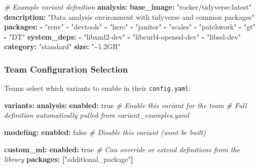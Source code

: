 \documentclass[
]{article}
\newenvironment{Shaded}{\begin{snugshade}}{\end{snugshade}}
\newcommand{\AttributeTok}[1]{\textcolor[rgb]{0.13,0.29,0.53}{#1}}
\newcommand{\CharTok}[1]{\textcolor[rgb]{0.31,0.60,0.02}{#1}}
\newcommand{\CommentTok}[1]{\textcolor[rgb]{0.56,0.35,0.01}{\textit{#1}}}
\newcommand{\FunctionTok}[1]{\textcolor[rgb]{0.13,0.29,0.53}{\textbf{#1}}}
\newcommand{\KeywordTok}[1]{\textcolor[rgb]{0.13,0.29,0.53}{\textbf{#1}}}
\newcommand{\StringTok}[1]{\textcolor[rgb]{0.31,0.60,0.02}{#1}}
\begin{document}
\begin{Shaded}
\begin{Highlighting}[]
\CommentTok{\# Example variant definition}
\FunctionTok{analysis}\KeywordTok{:}
\AttributeTok{  }\FunctionTok{base\_image}\KeywordTok{:}\AttributeTok{ }\StringTok{"rocker/tidyverse:latest"}
\AttributeTok{  }\FunctionTok{description}\KeywordTok{:}\AttributeTok{ }\StringTok{"Data analysis environment with tidyverse and common packages"}
\AttributeTok{  }\FunctionTok{packages}\KeywordTok{:}
\AttributeTok{    }\KeywordTok{{-}}\AttributeTok{ }\StringTok{"renv"}
\AttributeTok{    }\KeywordTok{{-}}\AttributeTok{ }\StringTok{"devtools"}
\AttributeTok{    }\KeywordTok{{-}}\AttributeTok{ }\StringTok{"here"}
\AttributeTok{    }\KeywordTok{{-}}\AttributeTok{ }\StringTok{"janitor"}
\AttributeTok{    }\KeywordTok{{-}}\AttributeTok{ }\StringTok{"scales"}
\AttributeTok{    }\KeywordTok{{-}}\AttributeTok{ }\StringTok{"patchwork"}
\AttributeTok{    }\KeywordTok{{-}}\AttributeTok{ }\StringTok{"gt"}
\AttributeTok{    }\KeywordTok{{-}}\AttributeTok{ }\StringTok{"DT"}
\AttributeTok{  }\FunctionTok{system\_deps}\KeywordTok{:}
\AttributeTok{    }\KeywordTok{{-}}\AttributeTok{ }\StringTok{"libxml2{-}dev"}
\AttributeTok{    }\KeywordTok{{-}}\AttributeTok{ }\StringTok{"libcurl4{-}openssl{-}dev"}
\AttributeTok{    }\KeywordTok{{-}}\AttributeTok{ }\StringTok{"libssl{-}dev"}
\AttributeTok{  }\FunctionTok{category}\KeywordTok{:}\AttributeTok{ }\StringTok{"standard"}
\AttributeTok{  }\FunctionTok{size}\KeywordTok{:}\AttributeTok{ }\StringTok{"\textasciitilde{}1.2GB"}
\end{Highlighting}
\end{Shaded}

\subsubsection{Team Configuration
Selection}\label{team-configuration-selection}

Teams select which variants to enable in their \texttt{config.yaml}:

\begin{Shaded}
\begin{Highlighting}[]
\FunctionTok{variants}\KeywordTok{:}
\AttributeTok{  }\FunctionTok{analysis}\KeywordTok{:}
\AttributeTok{    }\FunctionTok{enabled}\KeywordTok{:}\AttributeTok{ }\CharTok{true}\CommentTok{    \# Enable this variant for the team}
\CommentTok{    \# Full definition automatically pulled from variant\_examples.yaml}

\AttributeTok{  }\FunctionTok{modeling}\KeywordTok{:}
\AttributeTok{    }\FunctionTok{enabled}\KeywordTok{:}\AttributeTok{ }\CharTok{false}\CommentTok{   \# Disable this variant (won\textquotesingle{}t be built)}

\AttributeTok{  }\FunctionTok{custom\_ml}\KeywordTok{:}
\AttributeTok{    }\FunctionTok{enabled}\KeywordTok{:}\AttributeTok{ }\CharTok{true}
\CommentTok{    \# Can override or extend definitions from the library}
\AttributeTok{    }\FunctionTok{packages}\KeywordTok{:}\AttributeTok{ }\KeywordTok{[}\StringTok{"additional\_package"}\KeywordTok{]}
\end{Highlighting}
\end{Shaded}
\end{document}
